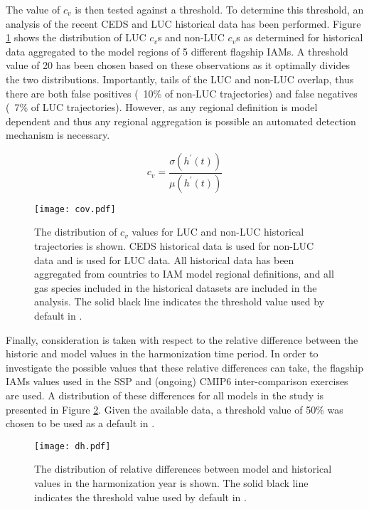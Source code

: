 The value of $c_v$ is then tested against a threshold. To determine this
threshold, an analysis of the recent CEDS and LUC historical data has been
performed. Figure \ref{fig:cov} shows the distribution of LUC $c_v$s and non-LUC
$c_v$s as determined for historical data aggregated to the model regions of 5
different flagship IAMs. A threshold value of 20 has been chosen based on these
observations as it optimally divides the two distributions. Importantly, tails
of the LUC and non-LUC overlap, thus there are both false positives (~10\% of
non-LUC trajectories) and false negatives (~7\% of LUC trajectories). However,
as any regional definition is model dependent and thus any regional aggregation
is possible an automated detection mechanism is necessary.

\begin{equation}\label{eqs:cov}
    c_v =  \frac{\sigma(h^{\prime}(t))}{\mu(h^{\prime}(t))}
\end{equation}


\begin{figure}
  \begin{center}
    \texttt{[image: cov.pdf]}
    \caption[]{
      \label{fig:cov}
      The distribution of $c_v$ values for LUC and non-LUC historical
      trajectories is shown. CEDS historical data \cite{hoesly_historical_2017}
      is used for non-LUC data and \cite{van_marle_historic_2017} is used for
      LUC data. All historical data has been aggregated from countries to IAM
      model regional definitions, and all gas species included in the historical
      datasets are included in the analysis. The solid black line indicates the
      threshold value used by default in .  }
  \end{center}
\end{figure}

Finally, consideration is taken with respect to the relative difference between
the historic and model values in the harmonization time period. In order to
investigate the possible values that these relative differences can take, the
flagship IAMs values used in the SSP and (ongoing) CMIP6 inter-comparison
exercises are used. A distribution of these differences for all models in the
study is presented in Figure \ref{fig:dh}. Given the available data, a threshold
value of 50\% was chosen to be used as a default in .

\begin{figure}
  \begin{center}
    \texttt{[image: dh.pdf]}
    \caption[]{
      \label{fig:dh}
      The distribution of relative differences between model and historical
      values in the harmonization year is shown. The solid black line indicates
      the threshold value used by default in .  
    }
  \end{center}
\end{figure}

